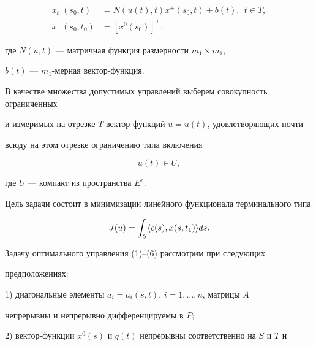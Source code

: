 \begin{equation}


\begin{split}


x_t^+(s_0,t)&=N(u(t),t)x^+(s_0,t)+b(t),\ \ t\in T,\\


x^+(s_0,t_0)&=[x^0(s_0)]^+,


\end{split}


\end{equation}


где $N(u,t)$ --- матричная функция размерности $m_1\times m_1$,


$b(t)$ --- $m_1$-мерная вектор-функция.


В качестве множества допустимых управлений выберем совокупность ограниченных


и измеримых на отрезке $T$ вектор-функций $u=u(t)$, удовлетворяющих почти


всюду на этом отрезке ограничению типа включения


\begin{equation}


u(t)\in U,


\end{equation}


где $U$ --- компакт из пространства $E^r$.





Цель задачи состоит в минимизации линейного функционала терминального типа


\begin{equation}


J(u)=\int_S\la c(s),x(s,t_1)\ra ds.


\end{equation}





Задачу оптимального управления (1)--(6) рассмотрим при следующих


предположениях:





1) диагональные элементы $a_i=a_i(s,t)$, $i=1,\dotsc,n$, матрицы $A$ 


непрерывны и непрерывно дифференцируемы в $P$;





2) вектор-функции $x^0(s)$ и $q(t)$ непрерывны соответственно на $S$ и $T$ и


